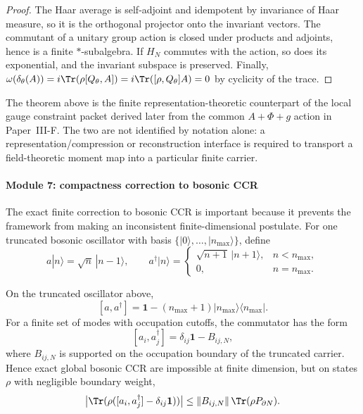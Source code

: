 \documentclass[12pt,a4paper]{article}
\begin{document}
\begin{proof}
The Haar average is self-adjoint and idempotent by invariance of Haar measure, so it is the orthogonal projector onto the invariant vectors.  The commutant of a unitary group action is closed under products and adjoints, hence is a finite \(*\)-subalgebra.  If \(H_N\) commutes with the action, so does its exponential, and the invariant subspace is preserved.  Finally, \(\omega(\delta_\theta(A))=i\Tr(\rho[Q_\theta,A])=i\Tr([\rho,Q_\theta]A)=0\) by cyclicity of the trace.
\end{proof}


\begin{remark}
\label{p4:rem:v176-finite-gauge-noether-typing}
The theorem above is the finite representation-theoretic counterpart of the
local gauge constraint packet derived later from the common
\(A+\Phi+g\) action in Paper~III-F.  The two are not identified by notation
alone: a representation/compression or reconstruction interface is required
to transport a field-theoretic moment map into a particular finite carrier.
\end{remark}


\paragraph{Module 7: compactness correction to bosonic CCR}
\label{p4:sec:module-ccr-defect}

The exact finite correction to bosonic CCR is important because it prevents the framework from making an inconsistent finite-dimensional postulate.  For one truncated bosonic oscillator with basis \(\{|0\rangle,\ldots,|n_{\max}\rangle\}\), define
\[
a|n\rangle=\sqrt n\,|n-1\rangle,
\qquad
a^\dagger|n\rangle=\begin{cases}
\sqrt{n+1}\,|n+1\rangle,&n<n_{\max},\\
0,&n=n_{\max}.
\end{cases}
\]


\begin{proposition}
\label{p4:prop:explicit-finite-ccr-boundary-defect}
On the truncated oscillator above,
\begin{equation}
\label{p4:eq:explicit-finite-ccr-defect}
[a,a^\dagger]
=
\mathbf 1-(n_{\max}+1)|n_{\max}\rangle\langle n_{\max}|.
\end{equation}
For a finite set of modes with occupation cutoffs, the commutator has the form
\begin{equation}
\label{p4:eq:multi-mode-ccr-defect}
[a_i,a_j^\dagger]=\delta_{ij}\mathbf 1-B_{ij,N},
\end{equation}
where \(B_{ij,N}\) is supported on the occupation boundary of the truncated carrier.  Hence exact global bosonic CCR are impossible at finite dimension, but on states \(\rho\) with negligible boundary weight,
\begin{equation}
\label{p4:eq:ccr-defect-expectation-bound}
\bigl|\Tr(\rho([a_i,a_j^\dagger]-\delta_{ij}\mathbf 1))\bigr|
\le \|B_{ij,N}\|\,\Tr(\rho P_{\partial N}).
\end{equation}
\end{proposition}
\end{document}
